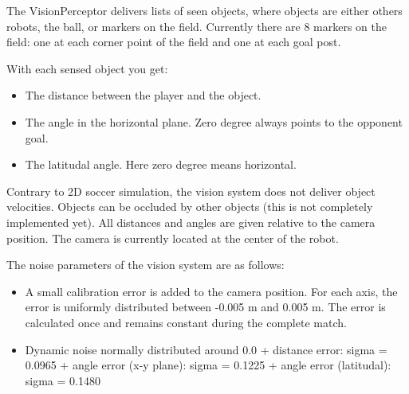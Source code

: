 The VisionPerceptor delivers lists of seen objects, where objects are
either others robots, the ball, or markers on the field. Currently
there are 8 markers on the field: one at each corner point of the
field and one at each goal post.

With each sensed object you get:

\begin{itemize}
  \item The distance between the player and the object.
  \item The angle in the horizontal plane. Zero degree always points to the
opponent goal.
  \item The latitudal angle. Here zero degree means horizontal. 
\end{itemize}

Contrary to 2D soccer simulation, the vision system does not deliver
object velocities. Objects can be occluded by other objects (this is
not completely implemented yet). All distances and angles are given
relative to the camera position. The camera is currently located at
the center of the robot.

The noise parameters of the vision system are as follows:
\begin{itemize}
  \item A small calibration error is added to the camera position. For each
  axis, the error is uniformly distributed between -0.005 m and 0.005 m. The
  error is calculated once and remains constant during the complete match.
  \item Dynamic noise normally distributed around 0.0
  + distance error:  sigma = 0.0965
  + angle error (x-y plane): sigma = 0.1225
  + angle error (latitudal): sigma = 0.1480
\end{itemize}

